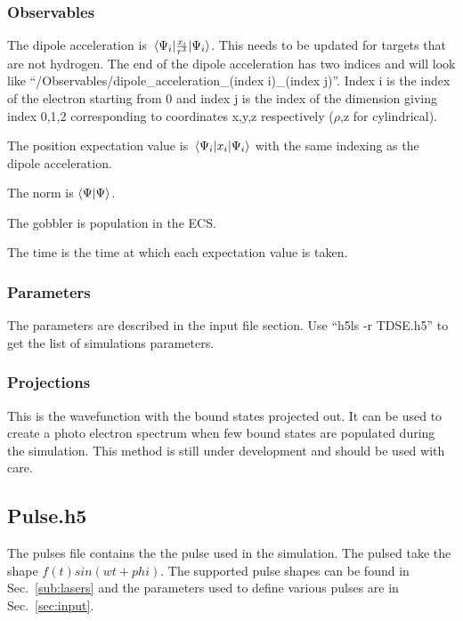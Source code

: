 \documentclass{article}
\begin{document}
\subsubsection{Observables} %
\label{ssub:observables}
The dipole acceleration is $\expval{\frac{x_i}{r^3}}{\Psi_i}$. This needs to be updated for targets that are not hydrogen. The end of the dipole acceleration has two indices and will look like ``/Observables/dipole\_acceleration\_(index i)\_(index j)''. Index i is the index of the electron starting from 0 and index j is the index of the dimension giving index 0,1,2 corresponding to coordinates x,y,z respectively ($\rho$,z for cylindrical).

The position expectation value is $\expval{x_i}{\Psi_i}$ with the same indexing as the dipole acceleration.

The norm is $\bra{\Psi}\ket{\Psi}$.

The gobbler is population in the ECS.

The time is the time at which each expectation value is taken.

\subsubsection{Parameters} %
\label{ssub:parameters}
The parameters are described in the input file section. Use ``h5ls -r TDSE.h5'' to get the list of simulations parameters.

\subsubsection{Projections} %
\label{ssub:projections}
This is the wavefunction with the bound states projected out. It can be used to create a photo electron spectrum when few bound states are populated during the simulation. This method is still under development and should be used with care.

\subsection{Pulse.h5} %
\label{sub:pulse_h5}
The pulses file contains the the pulse used in the simulation. The pulsed take the shape $f(t)sin(wt+phi)$. The supported pulse shapes can be found in Sec.~\ref{sub:lasers} and the parameters used to define various pulses are in Sec.~\ref{sec:input}.
\end{document}
